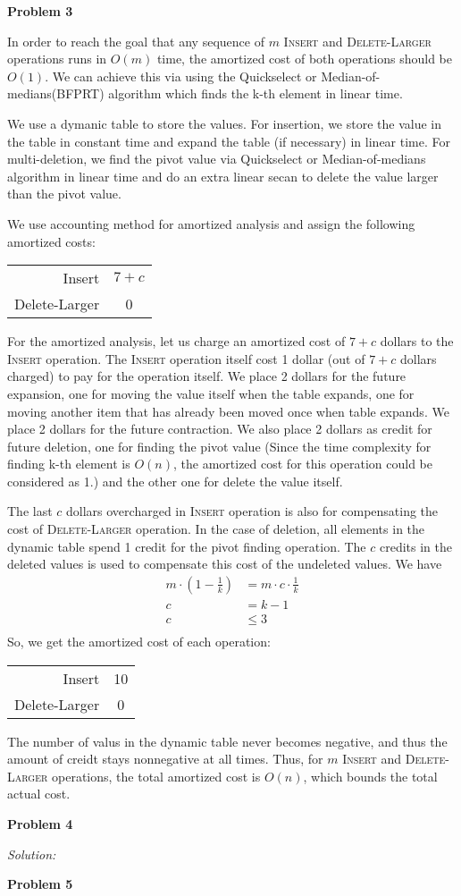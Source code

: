 \documentclass[12pt,letterpaper]{article}
\def\pp{\par\noindent}
\newcommand{\problem}[1]{ \bigskip \pp \textbf{Problem #1}\par}
\newcommand{\solution}{\medskip\pp\textit{Solution:}\par}
\begin{document}
\problem{3}
In order to reach the goal that any sequence of $m$ \textsc{Insert} and \textsc{Delete-Larger} operations runs in $O(m)$ time, the amortized cost of both operations should be $O(1)$. We can achieve this via using the Quickselect or Median-of-medians(BFPRT) algorithm which finds the k-th element in linear time.\par
We use a dymanic table to store the values. For insertion, we store the value in the table in constant time and expand the table (if necessary) in linear time. For multi-deletion, we find the pivot value via Quickselect or Median-of-medians algorithm in linear time and do an extra linear secan to delete the value larger than the pivot value.\par
We use accounting method for amortized analysis and assign the following amortized costs:
\begin{center}
	\begin{tabular}{r c}
		Insert & $7+c$\\
		Delete-Larger & 0 \\
	\end{tabular}
\end{center}
For the amortized analysis, let us charge an amortized cost of $7+c$ dollars to the \textsc{Insert} operation. The \textsc{Insert} operation itself cost 1 dollar (out of $7+c$ dollars charged) to pay for the operation itself. We place 2 dollars for the future expansion, one for moving the value itself when the table expands, one for moving another item that has already been moved once when table expands. We place 2 dollars for the future contraction. We also place 2 dollars as credit for future deletion, one for finding the pivot value (Since the time complexity for finding k-th element is $O(n)$, the amortized cost for this operation could be considered as 1.) and the other one for delete the value itself.\par
The last $c$ dollars overcharged in \textsc{Insert} operation is also for compensating the cost of \textsc{Delete-Larger} operation. In the case of deletion, all elements in the dynamic table spend 1 credit for the pivot finding operation. The $c$ credits in the deleted values is used to compensate this cost of the undeleted values. We have
\begin{align*}
	m\cdot(1-\frac{1}{k})&=m\cdot c\cdot\frac{1}{k}\\
	c&=k-1\\
	c&\leq 3\\
\end{align*}
So, we get the amortized cost of each operation:
\begin{center}
	\begin{tabular}{r c}
		Insert & 10\\
		Delete-Larger & 0 \\
	\end{tabular}
\end{center}
The number of valus in the dynamic table never becomes negative, and thus the amount of creidt stays nonnegative at all times. Thus, for $m$ \textsc{Insert} and \textsc{Delete-Larger} operations, the total amortized cost is $O(n)$, which bounds the total actual cost.

\problem{4}
\solution

\problem{5}
\end{document}
